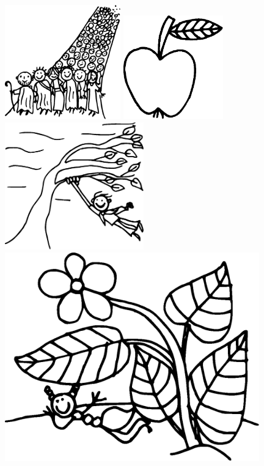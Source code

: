 \documentclass[11pt,a4paper,twoside]{article}
\begin{document}
\vfil
\vfil
\pagebreak
\vspace*{-1.8cm}\hspace*{6cm}\includegraphics[width=5cm]{13.eps}
\pagebreak
\vspace*{-1cm}\hspace*{6cm}\includegraphics[height=4.5cm]{14.eps}\vspace*{-3,5cm}
\hspace*{5cm}\includegraphics[width=6cm]{15.eps}
\pagebreak
\vfil
\hspace*{1cm}\includegraphics[width=11cm]{16.eps}
\end{document}
